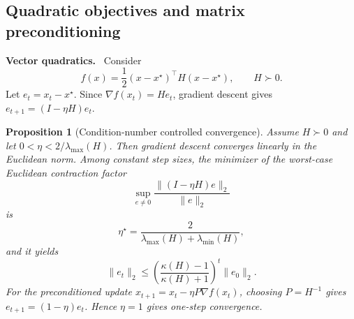 \documentclass[sigconf,nonacm]{acmart}
\newcommand{\vpara}[1]{\par\noindent\textbf{#1.}\ }
\newtheorem{proposition}{Proposition}
\begin{document}
\subsection{Quadratic objectives and matrix preconditioning}
\vpara{Vector quadratics} Consider
\begin{equation}
  f(x)=\frac{1}{2}(x-x^\star)^\top H(x-x^\star), \qquad H\succ 0.
\end{equation}
Let $e_t=x_t-x^\star$. Since $\nabla f(x_t)=He_t$, gradient descent gives $e_{t+1}=(I-\eta H)e_t$.

\begin{proposition}[Condition-number controlled convergence]\label{prop:gd}
Assume $H\succ0$ and let $0<\eta<2/\lambda_{\max}(H)$. Then gradient descent converges linearly in the Euclidean norm. Among constant step sizes, the minimizer of the worst-case Euclidean contraction factor
\begin{equation}
  \sup_{e\neq0}\frac{\|(I-\eta H)e\|_2}{\|e\|_2}
\end{equation}
is
\begin{equation}
  \eta^\star=\frac{2}{\lambda_{\max}(H)+\lambda_{\min}(H)},
\end{equation}
and it yields
\begin{equation}
  \|e_t\|_2 \leq \left(\frac{\kappa(H)-1}{\kappa(H)+1}\right)^t\|e_0\|_2 .
\end{equation}
For the preconditioned update $x_{t+1}=x_t-\eta P\nabla f(x_t)$, choosing $P=H^{-1}$ gives $e_{t+1}=(1-\eta)e_t$. Hence $\eta=1$ gives one-step convergence.
\end{proposition}
\end{document}
